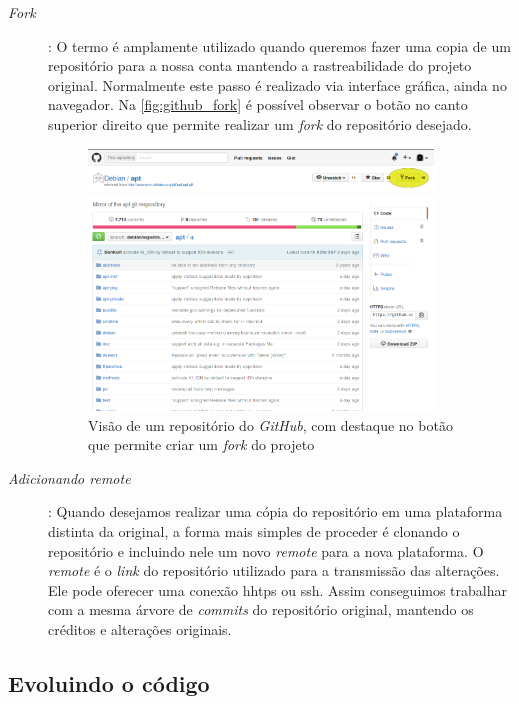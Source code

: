 \begin{description}
	\item [\textit{Fork}]: O termo é amplamente utilizado quando queremos fazer uma copia de um repositório para a nossa conta mantendo a rastreabilidade do projeto original. Normalmente este passo é realizado via interface gráfica, ainda no navegador. Na \autoref{fig:github_fork} é possível observar o botão no canto superior direito que permite realizar um \textit{fork} do repositório desejado.

	\begin{figure}[h]
	  \centering
		\includegraphics[width=0.90\textwidth]{figuras/fork}
	  \caption{Visão de um repositório do \textit{GitHub}, com destaque no botão que permite criar um \textit{fork} do projeto}
	  \label{fig:github_fork}
	\end{figure}

	\item [\textit{Adicionando \textit{remote}}]: Quando desejamos realizar uma cópia do repositório em uma plataforma distinta da original, a forma mais simples de proceder é clonando o repositório e incluindo nele um novo \textit{remote} para a nova plataforma. O \textit{remote} é o \textit{link} do repositório utilizado para a transmissão das alterações. Ele pode oferecer uma conexão {\code hhtps} ou {\code ssh}. Assim conseguimos trabalhar com a mesma árvore de \textit{commits} do repositório original, mantendo os créditos e alterações originais.
\end{description}

\subsection*{Evoluindo o código} %
\label{sub:evoluindo_o_c_digo}


